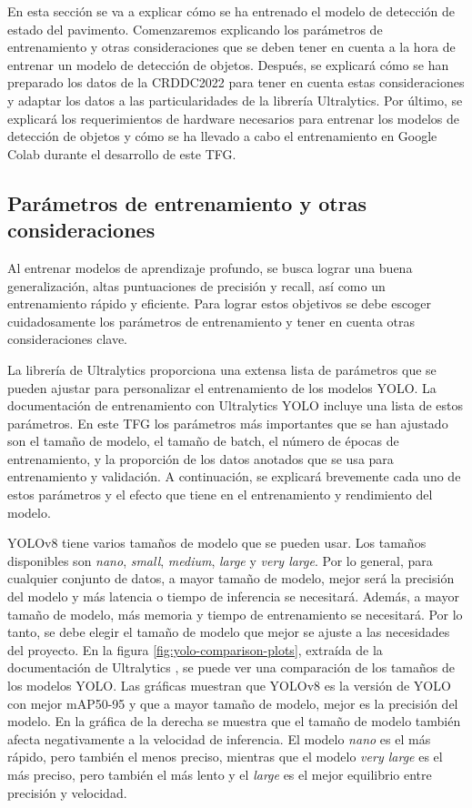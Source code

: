 En esta sección se va a explicar cómo se ha entrenado el modelo de detección de estado del pavimento. Comenzaremos explicando los parámetros de entrenamiento y otras consideraciones que se deben tener en cuenta a la hora de entrenar un modelo de detección de objetos. Después, se explicará cómo se han preparado los datos de la CRDDC2022 para tener en cuenta estas consideraciones y adaptar los datos a las particularidades de la librería Ultralytics. Por último, se explicará los requerimientos de hardware necesarios para entrenar los modelos de detección de objetos y cómo se ha llevado a cabo el entrenamiento en Google Colab durante el desarrollo de este TFG.

\subsection{Parámetros de entrenamiento y otras consideraciones}
Al entrenar modelos de aprendizaje profundo, se busca lograr una buena generalización, altas puntuaciones de precisión y recall, así como un entrenamiento rápido y eficiente. Para lograr estos objetivos se debe escoger cuidadosamente los parámetros de entrenamiento y tener en cuenta otras consideraciones clave.

La librería de Ultralytics proporciona una extensa lista de parámetros que se pueden ajustar para personalizar el entrenamiento de los modelos YOLO. La documentación de entrenamiento con Ultralytics YOLO \cite{ultralytics_train} incluye una lista de estos parámetros. En este TFG los parámetros más importantes que se han ajustado son el tamaño de modelo, el tamaño de batch, el número de épocas de entrenamiento, y la proporción de los datos anotados que se usa para entrenamiento y validación. A continuación, se explicará brevemente cada uno de estos parámetros y el efecto que tiene en el entrenamiento y rendimiento del modelo.

YOLOv8 tiene varios tamaños de modelo que se pueden usar. Los tamaños disponibles son \textit{nano}, \textit{small}, \textit{medium}, \textit{large} y \textit{very large}. Por lo general, para cualquier conjunto de datos, a mayor tamaño de modelo, mejor será la precisión del modelo y más latencia o tiempo de inferencia se necesitará. Además, a mayor tamaño de modelo, más memoria y tiempo de entrenamiento se necesitará. Por lo tanto, se debe elegir el tamaño de modelo que mejor se ajuste a las necesidades del proyecto. En la figura \ref{fig:yolo-comparison-plots}, extraída de la documentación de Ultralytics \cite{yolov8_ultralytics}, se puede ver una comparación de los tamaños de los modelos YOLO. Las gráficas muestran que YOLOv8 es la versión de YOLO con mejor mAP50-95 y que a mayor tamaño de modelo, mejor es la precisión del modelo. En la gráfica de la derecha se muestra que el tamaño de modelo también afecta negativamente a la velocidad de inferencia. El modelo \textit{nano} es el más rápido, pero también el menos preciso, mientras que el modelo \textit{very large} es el más preciso, pero también el más lento y el \textit{large} es el mejor equilibrio entre precisión y velocidad.

